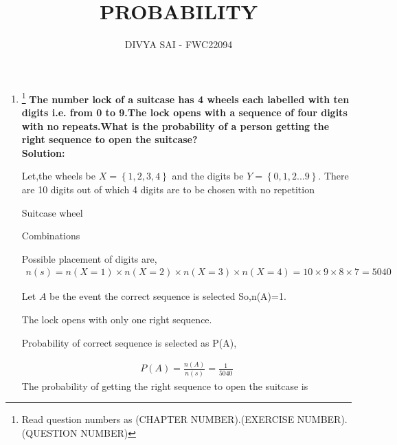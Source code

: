 \documentclass{article}
\providecommand{\cbrak}[1]{\ensuremath{\left\{#1\right\}}}
\begin{document}
\title{PROBABILITY}
\author{\Large DIVYA SAI - FWC22094}
\date{}

\maketitle
\begin{enumerate}[label=16.\arabic{enumi}.\arabic{enumii}]%
\setcounter{enumi}{3}
\setcounter{enumii}{10}

\item \footnote{Read question numbers as (CHAPTER NUMBER).(EXERCISE NUMBER).(QUESTION NUMBER)}
\textbf {The number lock of a suitcase has 4 wheels each labelled with ten digits i.e. from 0 to 9.The lock opens with a sequence of four digits with no repeats.What is the probability of a person getting the right sequence to open the suitcase?}\\[1ex]

\textbf{Solution:}

Let,the wheels be $X =\cbrak{1,2,3,4}$ and the digits be $Y=\cbrak{0,1,2...9}$.
There are 10 digits out of which 4 digits are to be chosen with no repetition

\begin{table}[h]
	
	    \label{fig:1}\caption{Suitcase wheel}
\end{table}

\begin{table}[h]
	
 \label{fig:2}\caption{Combinations}
\end{table}

Possible placement of digits are,
\begin{align}
n(s)=n(X=1) \times n(X=2) \times n(X=3) \times n(X=4)
=10 \times 9 \times 8 \times 7 = 5040 
\end{align}

Let $A$ be the event the correct sequence is selected So,n(A)=1.

The lock opens with only one right sequence.

Probability of correct sequence is selected as P(A),

\begin{align}
P(A)=\frac{n(A)}{n(s)}=\frac{1}{5040}
\end{align}
The probability of getting the right sequence to open the suitcase is 
\end{enumerate}
\end{document}
